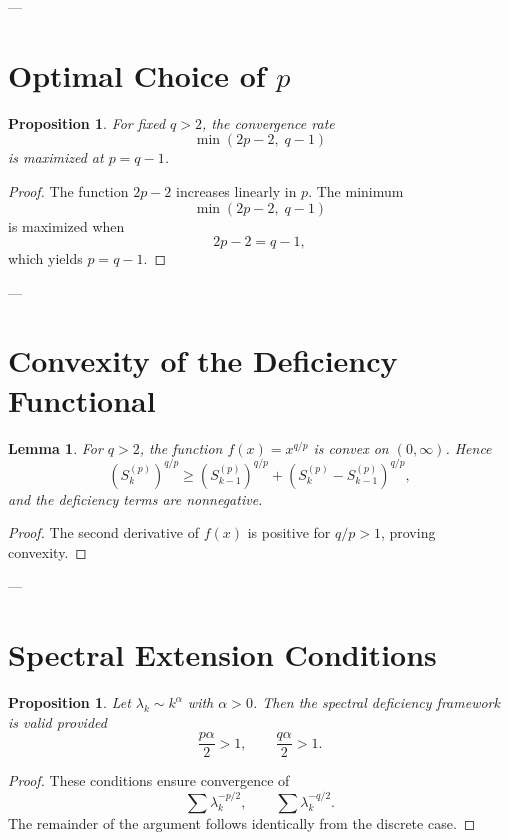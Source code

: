 \documentclass[11pt]{article}
\numberwithin{equation}{section}
\newtheorem{lemma}[theorem]{Lemma}
\newtheorem{proposition}[theorem]{Proposition}
\theoremstyle{definition}
\begin{document}
---

\section{Optimal Choice of $p$}

\begin{proposition}
\label{prop:optimal}
For fixed $q>2$, the convergence rate
\[
\min(2p-2,\;q-1)
\]
is maximized at $p = q-1$.
\end{proposition}

\begin{proof}
The function $2p-2$ increases linearly in $p$. The minimum
\[
\min(2p-2,\;q-1)
\]
is maximized when
\[
2p-2 = q-1,
\]
which yields $p = q-1$.
\end{proof}

---

\section{Convexity of the Deficiency Functional}

\begin{lemma}
\label{lem:convex}
For $q>2$, the function $f(x)=x^{q/p}$ is convex on $(0,\infty)$. Hence
\[
(S_k^{(p)})^{q/p} \ge (S_{k-1}^{(p)})^{q/p} + (S_k^{(p)}-S_{k-1}^{(p)})^{q/p},
\]
and the deficiency terms are nonnegative.
\end{lemma}

\begin{proof}
The second derivative of $f(x)$ is positive for $q/p>1$, proving convexity.
\end{proof}

---

\section{Spectral Extension Conditions}

\begin{proposition}
\label{prop:spectral}
Let $\lambda_k \sim k^\alpha$ with $\alpha>0$. Then the spectral deficiency framework is valid provided
\[
\frac{p\alpha}{2} > 1, \qquad \frac{q\alpha}{2} > 1.
\]
\end{proposition}

\begin{proof}
These conditions ensure convergence of
\[
\sum \lambda_k^{-p/2}, \qquad \sum \lambda_k^{-q/2}.
\]
The remainder of the argument follows identically from the discrete case.
\end{proof}
\end{document}
